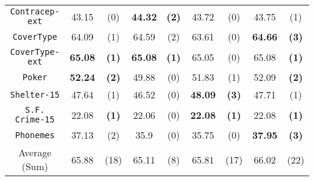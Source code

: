 \begin{table}
\begin{tabular}{c|cc|cc|cc|cc}
{\tt Contracep-ext} &  43.15       & (0)          &  {\bf 44.32} & {\bf (2)}    &  43.72       & (0)              & 43.75      & (1)          \\
{\tt CoverType}     &  64.09       & (1)          &  64.59       & (2)          &  63.61       & (0)              &{\bf 64.66} & {\bf (3)}    \\
{\tt CoverType-ext} &  {\bf 65.08} & {\bf (1)}    &  {\bf 65.08} & {\bf (1)}    &  65.05       & (0)              & 65.08      & {\bf (1)}    \\
{\tt Poker}         &  {\bf 52.24} & {\bf (2)}    &  49.88       & (0)          &  51.83       & (1)              & 52.09      & {\bf (2)}    \\ 
{\tt Shelter-15}    &  47.64       & (1)          &  46.52       & (0)          & {\bf 48.09}  & {\bf (3)}        & 47.71      & (1)          \\ 
{\tt S.F. Crime-15} &  22.08       & {\bf (1)}    &  22.06       & (0)          & {\bf 22.08}  & {\bf (1)}        & 22.08      & {\bf (1)}    \\   
{\tt Phonemes}      &  37.13       & (2)          &  35.9        & (0)          & 35.75        & (0)              &{\bf 37.95} & {\bf (3)}    \\
\hline
Average (Sum)       &  65.88       & (18)         &  65.11       & (8)          & 65.81        & (17)             &  66.02     & (22)
\end{tabular}
\normalsize
\label{tab:nominal-16}
\end{table}


